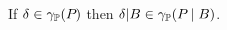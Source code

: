 \begin{lemma} \label{lem:pp:cond} If $ \delta \in \gamma_{\mathbb{P}}(P_{}) $ then $
  \delta | B \in \gamma_{\mathbb{P}}(P_{} \mid B) $.
\end{lemma}



















